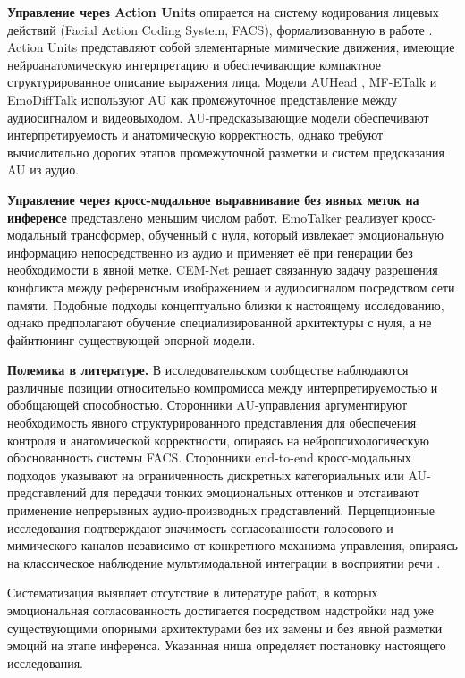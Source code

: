 \documentclass[a4paper, 12pt, oneside, openany]{article}
\begin{document}
\textbf{Управление через Action Units} опирается на систему кодирования лицевых действий (Facial Action Coding System, FACS), формализованную в работе \cite{ekman1978facs}. Action Units представляют собой элементарные мимические движения, имеющие нейроанатомическую интерпретацию и обеспечивающие компактное структурированное описание выражения лица. Модели AUHead \cite{lyu2026auhead}, MF-ETalk \cite{wang2025emotivetalk} и EmoDiffTalk \cite{liu2026emodifftalk} используют AU как промежуточное представление между аудиосигналом и видеовыходом. AU-предсказывающие модели обеспечивают интерпретируемость и анатомическую корректность, однако требуют вычислительно дорогих этапов промежуточной разметки и систем предсказания AU из аудио.

\textbf{Управление через кросс-модальное выравнивание без явных меток на инференсе} представлено меньшим числом работ. EmoTalker \cite{shen2024emotalker} реализует кросс-модальный трансформер, обученный с нуля, который извлекает эмоциональную информацию непосредственно из аудио и применяет её при генерации без необходимости в явной метке. CEM-Net \cite{wu2025cemnet} решает связанную задачу разрешения конфликта между референсным изображением и аудиосигналом посредством сети памяти. Подобные подходы концептуально близки к настоящему исследованию, однако предполагают обучение специализированной архитектуры с нуля, а не файнтюнинг существующей опорной модели.

\textbf{Полемика в литературе.} В исследовательском сообществе наблюдаются различные позиции относительно компромисса между интерпретируемостью и обобщающей способностью. Сторонники AU-управления \cite{lyu2026auhead,liu2026emodifftalk} аргументируют необходимость явного структурированного представления для обеспечения контроля и анатомической корректности, опираясь на нейропсихологическую обоснованность системы FACS. Сторонники end-to-end кросс-модальных подходов \cite{shen2024emotalker,wang2025emotivetalk} указывают на ограниченность дискретных категориальных или AU-представлений для передачи тонких эмоциональных оттенков и отстаивают применение непрерывных аудио-производных представлений. Перцепционные исследования \cite{suma2023,zhou2025} подтверждают значимость согласованности голосового и мимического каналов независимо от конкретного механизма управления, опираясь на классическое наблюдение мультимодальной интеграции в восприятии речи \cite{mcgurk1976}.

Систематизация выявляет отсутствие в литературе работ, в которых эмоциональная согласованность достигается посредством надстройки над уже существующими опорными архитектурами без их замены и без явной разметки эмоций на этапе инференса. Указанная ниша определяет постановку настоящего исследования.
\end{document}
